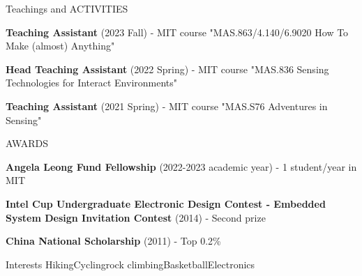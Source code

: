 \documentclass{resume} %
\begin{document}
\begin{rSection}{Teachings and ACTIVITIES}

\begin{itemlabel}

\item \textbf{Teaching Assistant} (2023 Fall) - MIT course "MAS.863/4.140/6.9020 How To Make (almost) Anything"
\smallskip
\smallskip

\item \textbf{Head Teaching Assistant} (2022 Spring) - MIT course "MAS.836 Sensing Technologies for Interact Environments"
\smallskip
\smallskip

\item \textbf{Teaching Assistant} (2021 Spring) - MIT course "MAS.S76 Adventures in Sensing"

\end{itemlabel}
\end{rSection}

\begin{rSection}{AWARDS}

\begin{itemlabel}
\item \textbf{Angela Leong Fund Fellowship} (2022-2023 academic year) - 1 student/year in MIT
\smallskip
\smallskip

\item \textbf{Intel Cup Undergraduate Electronic Design Contest - Embedded System Design Invitation Contest} (2014) - Second prize
\smallskip
\smallskip

\item \textbf{China National Scholarship} (2011) - Top 0.2\%
\smallskip
\smallskip

\end{itemlabel}
\end{rSection}

\begin{rSection}{Interests}
Hiking\hspace{1cm}Cycling\hspace{1cm}rock climbing\hspace{1cm}Basketball\hspace{1cm}Electronics
\end{rSection}

\end{document}
